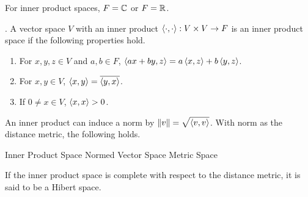 \medskip

For inner product spaces, \(F = \mathbb{C}\) or \(F = \mathbb{R}\).

.  A vector space \(V\) with an inner product \(\left\langle \cdot, \cdot \right\rangle: V \times V \rightarrow F\) is an inner product space if the following properties hold.
\begin{enumerate}
    \item {} For \(x, y, z \in V\) and \(a, b \in F\), \(\left\langle ax + by, z \right\rangle = a\left\langle x, z \right\rangle + b\left\langle y, z \right\rangle\).
    \item {} For \(x, y \in V\), \(\left\langle x, y \right\rangle = \overline{\left\langle y, x \right\rangle}\).
    \item {} If \(0 \neq x \in V\), \(\left\langle x, x \right\rangle > 0\).
\end{enumerate}

\rmk An inner product can induce a norm by \(\displaystyle \left\lVert v \right\rVert = \sqrt{\left\langle v, v \right\rangle}\). With norm as the distance metric, the following holds.
\begin{center}
    Inner Product Space \mimp Normed Vector Space \mimp Metric Space
\end{center}
If the inner product space is complete with respect to the distance metric, it is said to be a Hibert space.

\pagebreak
